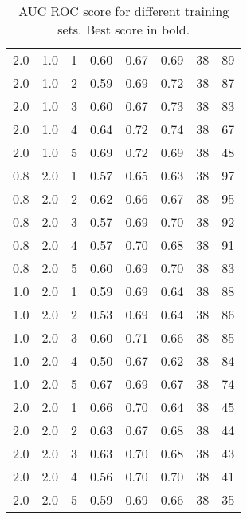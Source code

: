 \documentclass{article}
\begin{document}
\begin{table}[!h]
\begin{tabular}{C{1cm}  C{1cm}  C{1cm} | C{2cm} C{2cm} C{2cm} |  c c}
		2.0 & 1.0 & 1 & 0.60 & 0.67 & 0.69 & 38 & 89\\
		2.0 & 1.0 & 2 & 0.59 & 0.69 & 0.72 & 38 & 87\\
		2.0 & 1.0 & 3 & 0.60 & 0.67 & 0.73 & 38 & 83\\
		2.0 & 1.0 & 4 & 0.64 & 0.72 & 0.74 & 38 & 67\\
		2.0 & 1.0 & 5 & 0.69 & 0.72 & 0.69 & 38 & 48\\
		0.8 & 2.0 & 1 & 0.57 & 0.65 & 0.63 & 38 & 97\\
		0.8 & 2.0 & 2 & 0.62 & 0.66 & 0.67 & 38 & 95\\
		0.8 & 2.0 & 3 & 0.57 & 0.69 & 0.70 & 38 & 92\\
		0.8 & 2.0 & 4 & 0.57 & 0.70 & 0.68 & 38 & 91\\
		0.8 & 2.0 & 5 & 0.60 & 0.69 & 0.70 & 38 & 83\\
		1.0 & 2.0 & 1 & 0.59 & 0.69 & 0.64 & 38 & 88\\
		1.0 & 2.0 & 2 & 0.53 & 0.69 & 0.64 & 38 & 86\\
		1.0 & 2.0 & 3 & 0.60 & 0.71 & 0.66 & 38 & 85\\
		1.0 & 2.0 & 4 & 0.50 & 0.67 & 0.62 & 38 & 84\\
		1.0 & 2.0 & 5 & 0.67 & 0.69 & 0.67 & 38 & 74\\
		2.0 & 2.0 & 1 & 0.66 & 0.70 & 0.64 & 38 & 45\\
		2.0 & 2.0 & 2 & 0.63 & 0.67 & 0.68 & 38 & 44\\
		2.0 & 2.0 & 3 & 0.63 & 0.70 & 0.68 & 38 & 43\\
		2.0 & 2.0 & 4 & 0.56 & 0.70 & 0.70 & 38 & 41\\
		2.0 & 2.0 & 5 & 0.59 & 0.69 & 0.66 & 38 & 35\\
	\end{tabular}
	\caption{AUC ROC score for different training sets. Best score in bold.}
	\label{table:exp_res}
\end{table}


%
%
\end{document}
